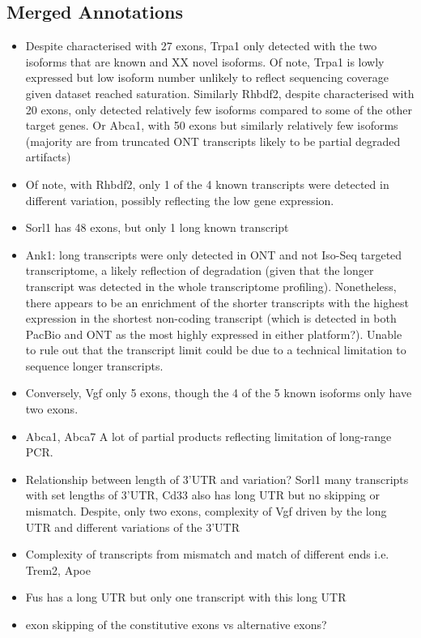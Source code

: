 \subsection{Merged Annotations}
\begin{itemize}
	\item Despite characterised with 27 exons, Trpa1 only detected with the two isoforms that are known and XX novel isoforms. Of note, Trpa1 is lowly expressed but low isoform number unlikely to reflect sequencing coverage given dataset reached saturation. Similarly Rhbdf2, despite characterised with 20 exons, only detected relatively few isoforms compared to some of the other target genes. Or Abca1, with 50 exons but similarly relatively few isoforms (majority are from truncated ONT transcripts likely to be partial degraded artifacts)
	\item Of note, with Rhbdf2, only 1 of the 4 known transcripts were detected in different variation, possibly reflecting the low gene expression. 
	\item Sorl1 has 48 exons, but only 1 long known transcript
	\item Ank1: long transcripts were only detected in ONT and not Iso-Seq targeted transcriptome, a likely reflection of degradation (given that the longer transcript was detected in the whole transcriptome profiling). Nonetheless, there appears to be an enrichment of the shorter transcripts with the highest expression in the shortest non-coding transcript (which is detected in both PacBio and ONT as the most highly expressed in either platform?). Unable to rule out that the transcript limit could be due to a technical limitation to sequence longer transcripts.  
	\item Conversely, Vgf only 5 exons, though the 4 of the 5 known isoforms only have two exons. 
 	\item Abca1, Abca7 A lot of partial products reflecting limitation of long-range PCR. 	
 	\item Relationship between length of 3'UTR and variation? Sorl1 many transcripts with set lengths of 3'UTR, Cd33 also has long UTR but no skipping or mismatch. Despite, only two exons, complexity of Vgf driven by the long UTR and different variations of the 3'UTR 
 	\item Complexity of transcripts from mismatch and match of different ends i.e. Trem2, Apoe
 	\item Fus has a long UTR but only one transcript with this long UTR 	
 	\item exon skipping of the constitutive exons vs alternative exons?
\end{itemize}

